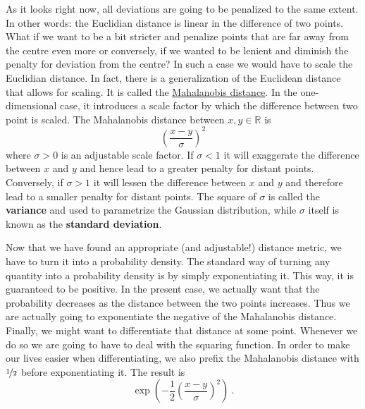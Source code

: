 As it looks right now, all deviations are going to be penalized to the same extent. In other words: the Euclidian distance is linear in the difference of two points.
What if we want to be a bit stricter and penalize points that are far away from the centre even more or conversely, if we wanted to be lenient and diminish the penalty
for deviation from the centre? In such a case we would have to scale the Euclidian distance. In fact, there is a generalization of the Euclidean distance that
allows for scaling. It is called the \href{https://en.wikipedia.org/wiki/Mahalanobis_distance}{Mahalanobis distance}. In the one-dimensional case, it introduces
a scale factor by which the difference between two point is scaled. The Mahalanobis distance between $ x,y \in \mathbb{R} $ is 
\begin{equation*}
\left(\frac{x - y}{\sigma}\right)^{2}
\end{equation*}
where $ \sigma > 0 $ is an adjustable scale factor. If $ \sigma < 1 $ it will exaggerate the difference between $ x $ and $ y $ and hence lead to a greater
penalty for distant points. Conversely, if $ \sigma > 1 $ it will lessen the difference between $ x $ and $ y $ and therefore lead to a smaller penalty for 
distant points. The square of $ \sigma $ is called the \textbf{variance} and used to parametrize the Gaussian distribution, while $ \sigma $ itself is 
known as the \textbf{standard deviation}.

Now that we have found an appropriate (and adjustable!) distance metric, we have to turn it into a probability density. The standard way of turning any quantity
into a probability density is by simply exponentiating it. This way, it is guaranteed to be positive. In the present case, we actually want that the probability
decreases as the distance between the two points increases. Thus we are actually going to exponentiate the negative of the Mahalanobis distance. Finally, we
might want to differentiate that distance at some point. Whenever we do so we are going to have to deal with the squaring function. In order to make our lives
easier when differentiating, we also prefix the Mahalanobis distance with $ \nicefrac{1}{2} $ before exponentiating it. The result is
\begin{equation}
\exp\left(-\frac{1}{2} \left(\frac{x - y}{\sigma}\right)^{2} \right) \ .
\end{equation}

